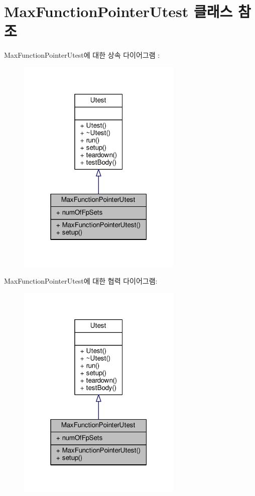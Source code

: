 \hypertarget{class_max_function_pointer_utest}{}\section{Max\+Function\+Pointer\+Utest 클래스 참조}
\label{class_max_function_pointer_utest}


Max\+Function\+Pointer\+Utest에 대한 상속 다이어그램 \+: 
\nopagebreak
\begin{figure}[H]
\begin{center}
\leavevmode
\includegraphics[width=223pt]{class_max_function_pointer_utest__inherit__graph}
\end{center}
\end{figure}


Max\+Function\+Pointer\+Utest에 대한 협력 다이어그램\+:
\nopagebreak
\begin{figure}[H]
\begin{center}
\leavevmode
\includegraphics[width=223pt]{class_max_function_pointer_utest__coll__graph}
\end{center}
\end{figure}
